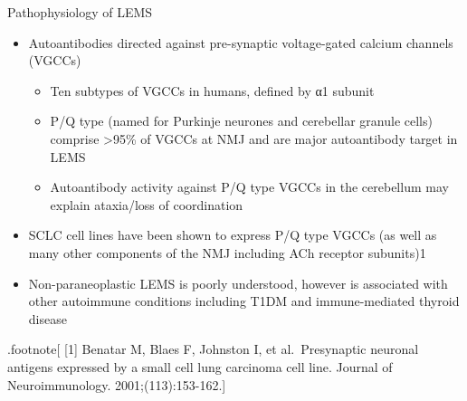 \documentclass[
  ignorenonframetext,
]{beamer}
\providecommand{\tightlist}{%
  \setlength{\itemsep}{0pt}\setlength{\parskip}{0pt}}
\begin{document}
\begin{frame}{Pathophysiology of LEMS}
\protect\hypertarget{pathophysiology-of-lems}{}
\begin{itemize}
\tightlist
\item
  Autoantibodies directed against pre-synaptic voltage-gated calcium
  channels (VGCCs)

  \begin{itemize}
  \tightlist
  \item
    Ten subtypes of VGCCs in humans, defined by α1 subunit
  \item
    P/Q type (named for Purkinje neurones and cerebellar granule cells)
    comprise \textgreater95\% of VGCCs at NMJ and are major autoantibody
    target in LEMS
  \item
    Autoantibody activity against P/Q type VGCCs in the cerebellum may
    explain ataxia/loss of coordination
  \end{itemize}
\item
  SCLC cell lines have been shown to express P/Q type VGCCs (as well as
  many other components of the NMJ including ACh receptor subunits)1
\item
  Non-paraneoplastic LEMS is poorly understood, however is associated
  with other autoimmune conditions including T1DM and immune-mediated
  thyroid disease
\end{itemize}

.footnote{[} {[}1{]} Benatar M, Blaes F, Johnston I, et al.~Presynaptic
neuronal antigens expressed by a small cell lung carcinoma cell line.
Journal of Neuroimmunology. 2001;(113):153-162.{]}
\end{frame}
\end{document}
